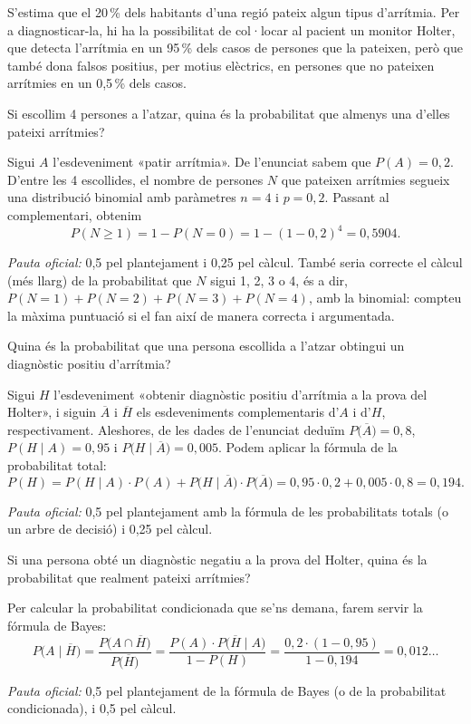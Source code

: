 S'estima que el 20\,\% dels habitants d'una regió pateix algun tipus d'arrítmia. Per a diagnosticar-la, hi ha la
possibilitat de col·locar al pacient un monitor Holter, que detecta l'arrítmia en un 95\,\% dels casos de
persones que la pateixen, però que també dona falsos positius, per motius elèctrics, en persones que no
pateixen arrítmies en un 0,5\,\% dels casos.

\begin{apartats}

Si escollim 4 persones a l'atzar, quina és la probabilitat que almenys una d'elles pateixi arrítmies?

\begin{solucio}
Sigui $A$ l'esdeveniment «patir arrítmia». De l'enunciat sabem que $P(A)=0{,}2$. D'entre les 4 escollides, el
nombre de persones $N$ que pateixen arrítmies segueix una distribució binomial amb paràmetres $n=4$ i
$p=0{,}2$. Passant al complementari, obtenim
\[
P(N\ge1)=1-P(N=0)=1-(1-0{,}2)^4=0{,}5904 .
\]

\textit{Pauta oficial:} 0,5 pel plantejament i 0,25 pel càlcul. També seria correcte el càlcul (més llarg) de
la probabilitat que $N$ sigui 1, 2, 3 o 4, és a dir, $P(N=1)+P(N=2)+P(N=3)+P(N=4)$, amb la binomial: compteu
la màxima puntuació si el fan així de manera correcta i argumentada.
\end{solucio}

Quina és la probabilitat que una persona escollida a l'atzar obtingui un diagnòstic positiu d'arrítmia?

\begin{solucio}
Sigui $H$ l'esdeveniment «obtenir diagnòstic positiu d'arrítmia a la prova del Holter», i siguin
$\overline{A}$ i $\overline{H}$ els esdeveniments complementaris d'$A$ i d'$H$, respectivament. Aleshores,
de les dades de l'enunciat deduïm $P\bigl(\overline{A}\bigr)=0{,}8$, $P(H\mid A)=0{,}95$ i
$P\bigl(H\mid\overline{A}\bigr)=0{,}005$. Podem aplicar la fórmula de la probabilitat total:
\[
P(H)=P(H\mid A)\cdot P(A)+P\bigl(H\mid\overline{A}\bigr)\cdot P\bigl(\overline{A}\bigr)=0{,}95\cdot0{,}2+0{,}005\cdot0{,}8
=0{,}194 .
\]

\textit{Pauta oficial:} 0,5 pel plantejament amb la fórmula de les probabilitats totals (o un arbre de decisió)
i 0,25 pel càlcul.
\end{solucio}

Si una persona obté un diagnòstic negatiu a la prova del Holter, quina és la probabilitat que realment
pateixi arrítmies?

\begin{solucio}
Per calcular la probabilitat condicionada que se'ns demana, farem servir la fórmula de Bayes:
\[
P\bigl(A\mid\overline{H}\bigr)=\frac{P\bigl(A\cap\overline{H}\bigr)}{P\bigl(\overline{H}\bigr)}
=\frac{P(A)\cdot P\bigl(\overline{H}\mid A\bigr)}{1-P(H)}=\frac{0{,}2\cdot(1-0{,}95)}{1-0{,}194}=0{,}012\ldots
\]

\textit{Pauta oficial:} 0,5 pel plantejament de la fórmula de Bayes (o de la probabilitat condicionada), i 0,5
pel càlcul.
\end{solucio}

\end{apartats}
